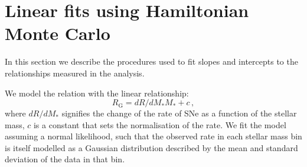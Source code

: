 \documentclass[fleqn,usenatbib]{mnras}
\begin{document}



\appendix

\section{Linear fits using Hamiltonian Monte Carlo}
In this section we describe the procedures used to fit slopes and intercepts to the relationships measured in the analysis.

\label{appendix:linear_fits}
We model the relation with the linear relationship: 
\begin{equation}
    R_{\mathrm{G}} = dR/dM_* M_* + c \,,
\label{eq:rate_fit}
\end{equation}
where $dR/dM_*$ signifies the change of the rate of SNe as a function of the stellar mass, $c$ is a constant that sets the normalisation of the rate. We fit the model assuming a normal likelihood, such that the observed rate in each stellar mass bin is itself modelled as a Gaussian distribution described by the mean and standard deviation of the data in that bin.



\bsp	%
\label{lastpage}
\end{document}
